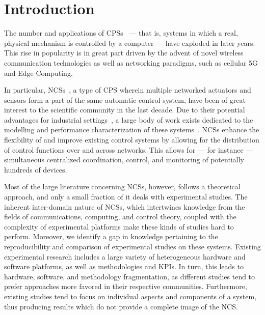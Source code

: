 \section{Introduction}\label{sec:intro}


The number and applications of \acp{CPS}~\cite{Rajkumar2010CPS} --- that is, systems in which a real, physical mechanism is controlled by a computer --- have exploded in later years.
This rise in popularity is in great part driven by the advent of novel wireless communication technologies as well as networking paradigms, such as cellular 5G and Edge Computing.

In particular, \acp{NCS}~\cite{Gupta2010NCSOverview}, a type of \ac{CPS} wherein multiple networked actuators and sensors form a part of the same automatic control system, have been of great interest to the scientific community in the last decade.
Due to their potential advantages for industrial settings~\cite{Lu2015WSAN}, a large body of work exists dedicated to the modelling and performance characterization of these systems~\cite{Hespanha2007Survey,Zhang2013Survey,Zhang2016Survey}.
\Acp{NCS} enhance the flexibility of and improve existing control systems by allowing for the distribution of control functions over and across networks.
This allows for --- for instance --- simultaneous centralized coordination, control, and monitoring of potentially hundreds of devices.

Most of the large literature concerning \acp{NCS}, however, follows a theoretical approach, and only a small fraction of it deals with experimental studies.
The inherent inter-domain nature of \acp{NCS}, which intertwines knowledge from the fields of communications, computing, and control theory, coupled with the complexity of experimental platforms make these kinds of studies hard to perform.
Moreover, we identify a gap in knowledge pertaining to the reproducibility and comparison of experimental studies on these systems.
Existing experimental research includes a large variety of heterogeneous hardware and software platforms, as well as methodologies and \acp{KPI}.
In turn, this leads to hardware, software, and methodology fragmentation, as different studies tend to prefer approaches more favored in their respective communities.
Furthermore, existing studies tend to focus on individual aspects and components of a system, thus producing results which do not provide a complete image of the \ac{NCS}.

